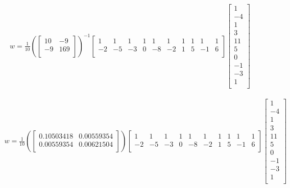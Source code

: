 \documentclass[12pt]{article}
\begin{document}
\begin{enumerate}
\begin{enumerate}
\begin{equation}
	\begin{split}
		w = \frac{1}{10} (\begin{bmatrix}
			10 & -9\\
			-9 & 169\\
		\end{bmatrix})^{-1}\begin{bmatrix}
		1 & 1 & 1 & 1 & 1 & 1 & 1 & 1 & 1 & 1\\
		-2 & -5 & -3 & 0 & -8 & -2 & 1 & 5 & -1 & 6\\
	\end{bmatrix}\begin{bmatrix}
			1\\
			-4\\	
			1\\
			3\\
			11\\
			5\\
			0\\
			-1\\
			-3\\
			1\\
		\end{bmatrix}
	\end{split}
\end{equation}

\begin{equation}
	\begin{split}
		w = \frac{1}{10} (\begin{bmatrix}
			0.10503418 & 0.00559354\\
			0.00559354 & 0.00621504\\
		\end{bmatrix})\begin{bmatrix}
			1 & 1 & 1 & 1 & 1 & 1 & 1 & 1 & 1 & 1\\
			-2 & -5 & -3 & 0 & -8 & -2 & 1 & 5 & -1 & 6\\
		\end{bmatrix}\begin{bmatrix}
			1\\
			-4\\	
			1\\
			3\\
			11\\
			5\\
			0\\
			-1\\
			-3\\
			1\\
		\end{bmatrix}
	\end{split}
\end{equation}


\end{enumerate}
\end{enumerate}
\end{document}
